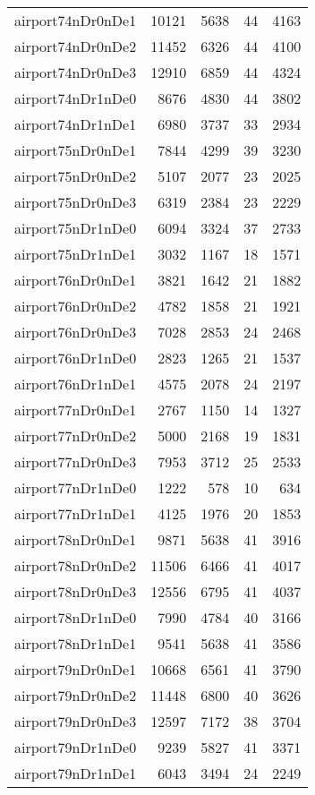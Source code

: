 \begin{longtable}{lrrrr}
airport74nDr0nDe1 & 10121 & 5638 & 44 & 4163 \\
airport74nDr0nDe2 & 11452 & 6326 & 44 & 4100 \\
airport74nDr0nDe3 & 12910 & 6859 & 44 & 4324 \\
airport74nDr1nDe0 & 8676 & 4830 & 44 & 3802 \\
airport74nDr1nDe1 & 6980 & 3737 & 33 & 2934 \\
airport75nDr0nDe1 & 7844 & 4299 & 39 & 3230 \\
airport75nDr0nDe2 & 5107 & 2077 & 23 & 2025 \\
airport75nDr0nDe3 & 6319 & 2384 & 23 & 2229 \\
airport75nDr1nDe0 & 6094 & 3324 & 37 & 2733 \\
airport75nDr1nDe1 & 3032 & 1167 & 18 & 1571 \\
airport76nDr0nDe1 & 3821 & 1642 & 21 & 1882 \\
airport76nDr0nDe2 & 4782 & 1858 & 21 & 1921 \\
airport76nDr0nDe3 & 7028 & 2853 & 24 & 2468 \\
airport76nDr1nDe0 & 2823 & 1265 & 21 & 1537 \\
airport76nDr1nDe1 & 4575 & 2078 & 24 & 2197 \\
airport77nDr0nDe1 & 2767 & 1150 & 14 & 1327 \\
airport77nDr0nDe2 & 5000 & 2168 & 19 & 1831 \\
airport77nDr0nDe3 & 7953 & 3712 & 25 & 2533 \\
airport77nDr1nDe0 & 1222 & 578 & 10 & 634 \\
airport77nDr1nDe1 & 4125 & 1976 & 20 & 1853 \\
airport78nDr0nDe1 & 9871 & 5638 & 41 & 3916 \\
airport78nDr0nDe2 & 11506 & 6466 & 41 & 4017 \\
airport78nDr0nDe3 & 12556 & 6795 & 41 & 4037 \\
airport78nDr1nDe0 & 7990 & 4784 & 40 & 3166 \\
airport78nDr1nDe1 & 9541 & 5638 & 41 & 3586 \\
airport79nDr0nDe1 & 10668 & 6561 & 41 & 3790 \\
airport79nDr0nDe2 & 11448 & 6800 & 40 & 3626 \\
airport79nDr0nDe3 & 12597 & 7172 & 38 & 3704 \\
airport79nDr1nDe0 & 9239 & 5827 & 41 & 3371 \\
airport79nDr1nDe1 & 6043 & 3494 & 24 & 2249 \\

\end{longtable}
